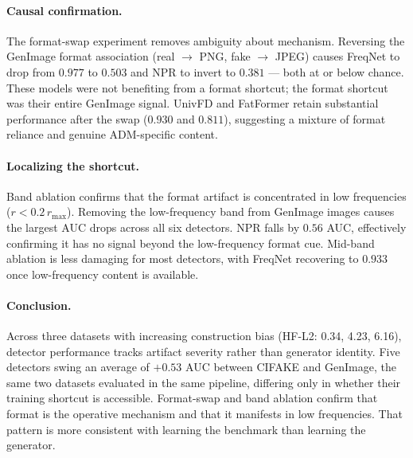 \paragraph{Causal confirmation.}
The format-swap experiment removes ambiguity about mechanism.
Reversing the GenImage format association (real $\to$ PNG, fake $\to$ JPEG) causes FreqNet to drop from $0.977$ to $0.503$ and NPR to invert to $0.381$ --- both at or below chance.
These models were not benefiting from a format shortcut; the format shortcut was their entire GenImage signal.
UnivFD and FatFormer retain substantial performance after the swap ($0.930$ and $0.811$), suggesting a mixture of format reliance and genuine ADM-specific content.

\paragraph{Localizing the shortcut.}
Band ablation confirms that the format artifact is concentrated in low frequencies ($r < 0.2\,r_{\max}$).
Removing the low-frequency band from GenImage images causes the largest AUC drops across all six detectors.
NPR falls by $0.56$ AUC, effectively confirming it has no signal beyond the low-frequency format cue.
Mid-band ablation is less damaging for most detectors, with FreqNet recovering to $0.933$ once low-frequency content is available.

\paragraph{Conclusion.}
Across three datasets with increasing construction bias (HF-L2: 0.34, 4.23, 6.16), detector performance tracks artifact severity rather than generator identity.
Five detectors swing an average of $+0.53$ AUC between CIFAKE and GenImage, the same two datasets evaluated in the same pipeline, differing only in whether their training shortcut is accessible.
Format-swap and band ablation confirm that format is the operative mechanism and that it manifests in low frequencies.
That pattern is more consistent with learning the benchmark than learning the generator.
